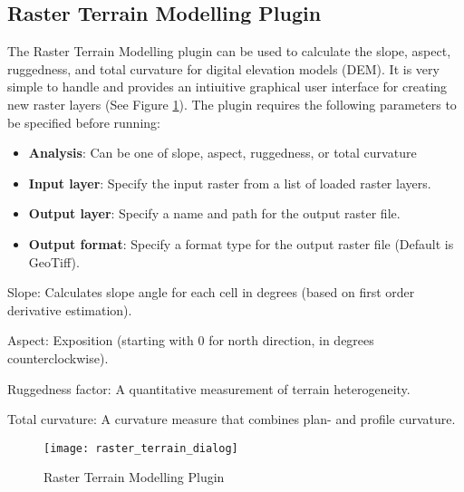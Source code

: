 
\subsection{Raster Terrain Modelling Plugin}


The Raster Terrain Modelling plugin can be used to calculate the slope, aspect, ruggedness, and
total curvature for digital elevation models (DEM). It is very simple to handle and provides an
intiuitive graphical user interface for creating new raster layers (See Figure
\ref{fig:raster_terrain_dialog}).
The plugin requires the following parameters to be specified before running:

\begin{itemize}
\item \textbf{Analysis}: Can be one of slope, aspect, ruggedness, or total curvature
\item \textbf{Input layer}: Specify the input raster from a list of loaded
raster layers.
\item \textbf{Output layer}: Specify a name and path for the output raster file.
\item \textbf{Output format}: Specify a format type for the output raster file (Default is GeoTiff).
\end{itemize}

Slope: Calculates slope angle for each cell in degrees (based on first order derivative estimation).

Aspect: Exposition (starting with 0 for north direction, in degrees counterclockwise).

Ruggedness factor: A quantitative measurement of terrain heterogeneity.

Total curvature: A curvature measure that combines plan- and profile curvature.

\begin{figure}[ht]
   \begin{center}
   \caption{Raster Terrain Modelling Plugin \nixcaption}\label{fig:raster_terrain_dialog}\smallskip
   \texttt{[image: raster\_terrain\_dialog]}
\end{center}  
\end{figure}

\label{raster_terrain_usage}

